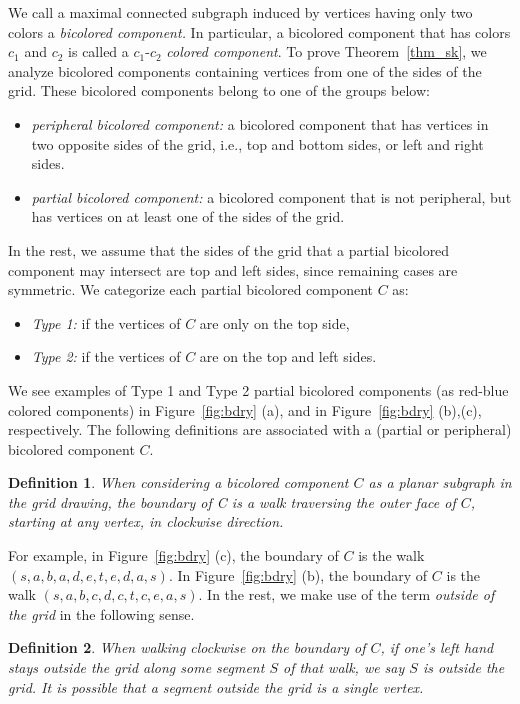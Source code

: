 \documentclass[
final, nomarks
]{dmtcs-episciences}
\newtheorem{definition}{Definition}
\begin{document}
We call a maximal connected subgraph induced by vertices having only two colors a {\it bicolored component.} In particular, a bicolored component that has colors $c_1$ and $c_2$ is called a $c_1$-$c_2$ {\it colored component}. To prove Theorem~\ref{thm_sk}, we analyze bicolored components containing vertices from one of the sides of the grid. These bicolored components belong to one of the groups below: 
\begin{itemize}
    \item {\it peripheral bicolored component:} a bicolored component that has vertices in two opposite sides of the grid, i.e., top and bottom sides, or left and right sides.
    \item  {\it partial bicolored component:} a bicolored component that is not peripheral, but has vertices on at least one of the sides of the grid. 
\end{itemize}
In the rest, we assume that the sides of the grid that a partial bicolored component may intersect are top and left sides, since remaining cases are symmetric. We categorize each partial bicolored component $C$ as:
\begin{itemize}
    \item {\it Type 1:} if the vertices of $C$ are only on the top side,
    \item {\it Type 2:} if the vertices of $C$ are on the top and left sides.
\end{itemize}
We see examples of Type 1 and Type 2 partial bicolored components (as red-blue colored components) in Figure~\ref{fig:bdry} (a), and in Figure~\ref{fig:bdry} (b),(c), respectively. The following definitions are associated with a (partial or peripheral) bicolored component $C$.  
\begin{definition} When considering a bicolored component $C$ as a planar subgraph in the grid drawing, the {\it boundary of C} is a walk traversing the outer face of $C$, starting at any vertex, in clockwise direction.  
\end{definition}
For example, in Figure~\ref{fig:bdry} (c), the boundary of $C$ is the walk $(s, a, b, a, d, e, t, e, d, a, s).$ In Figure~\ref{fig:bdry} (b),  the boundary of $C$ is the walk $(s,a,b,c,d,c,t,c,e,a,s).$ In the rest, we make use of the term {\it outside of the grid} in the following sense. 
\begin{definition}\label{def:outside_grid}
 When walking clockwise on the boundary of $C$, if one's left hand stays outside the grid along some segment $S$ of that walk, we say $S$ is outside the grid. It is possible that a segment outside the grid is a single vertex.     
\end{definition}
\end{document}
